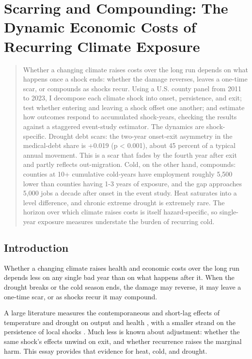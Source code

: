 \documentclass[a4paper,11pt]{report}
\begin{document}
\FloatBarrier
\renewcommand{\thesection}{\thechapter.\arabic{section}}
\renewcommand{\theHsection}{\thechapter.\arabic{section}}

\chapter{Scarring and Compounding: The Dynamic Economic Costs of Recurring Climate Exposure}

\begingroup\small\begin{quote}
Whether a changing climate raises costs over the long run depends on what happens once a shock ends: whether the damage reverses, leaves a one-time scar, or compounds as shocks recur. Using a U.S. county panel from 2011 to 2023, I decompose each climate shock into onset, persistence, and exit; test whether entering and leaving a shock offset one another; and estimate how outcomes respond to accumulated shock-years, checking the results against a staggered event-study estimator. The dynamics are shock-specific. Drought debt scars: the two-year onset-exit asymmetry in the medical-debt share is +0.019 (p < 0.001), about 45 percent of a typical annual movement. This is a scar that fades by the fourth year after exit and partly reflects out-migration. Cold, on the other hand, compounds: counties at 10+ cumulative cold-years have employment roughly 5,500 lower than counties having 1-3 years of exposure, and the gap approaches 5,000 jobs a decade after onset in the event study. Heat saturates into a level difference, and chronic extreme drought is extremely rare. The horizon over which climate raises costs is itself hazard-specific, so single-year exposure measures understate the burden of recurring cold.
\end{quote}\endgroup

\FloatBarrier
\section{Introduction}

Whether a changing climate raises health and economic costs over the long run depends less on any single bad year than on what happens after it. When the drought breaks or the cold season ends, the damage may reverse, it may leave a one-time scar, or as shocks recur it may compound.

A large literature measures the contemporaneous and short-lag effects of temperature and drought on output and health \citep{dell2014weather}, with a smaller strand on the persistence of local shocks \citep{hsiang2014cyclones,deryugina2018katrina}. Much less is known about adjustment: whether the same shock's effects unwind on exit, and whether recurrence raises the marginal harm. This essay provides that evidence for heat, cold, and drought.
\end{document}
